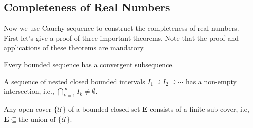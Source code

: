 \subsection{Completeness of Real Numbers}
Now we use Cauchy sequence to construct the completeness of real numbers. First let's give a proof of three important theorems. Note that the proof and applications of these theorems are mandatory.
\begin{theorem}\label{The:2:3}
Every bounded sequence has a convergent subsequence.
\end{theorem}
\begin{theorem}
A sequence of nested closed bounded intervals $I_1\supseteq I_2\supseteq\cdots$ has a non-empty intersection, i.e., $\bigcap_{k=1}^\infty I_k \ne\emptyset$.
\end{theorem}
\begin{theorem}
Any open cover $\{\mathcal{U}\}$ of a bounded closed set $\bm E$ consists of a finite sub-cover, i.e, $\bm E\subseteq\mbox{the union of }\{\mathcal{U}\}$.
\end{theorem}


